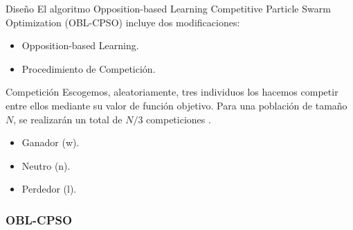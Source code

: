 \begin{frame}{}
\begin{block}{Diseño}
El algoritmo Opposition-based Learning Competitive Particle Swarm Optimization (OBL-CPSO) \cite{oblcpso} incluye dos modificaciones:
\begin{itemize}
	\item Opposition-based Learning.
	\item Procedimiento de Competición.
\end{itemize}
\end{block}

\begin{block}{Competición}
Escogemos, aleatoriamente, tres individuos los hacemos competir entre ellos mediante su valor de función objetivo. 
Para una población de tamaño $N$, se realizarán un total de $N/3$ competiciones \cite{oblcpso}.
\begin{itemize}
  \Fontvi
  \item Ganador (w).
  \item Neutro (n).
  \item Perdedor (l).
\end{itemize}
\end{block}
\end{frame}

\begin{frame}
\frametitle{OBL-CPSO}
\centering
\end{frame}


